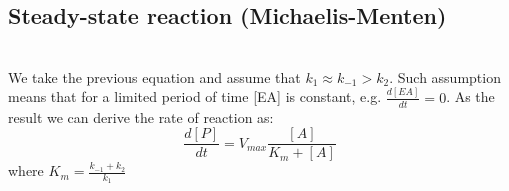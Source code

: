 \documentclass[twoside,twocolumn]{article}
\begin{document}
\subsection{Steady-state reaction (Michaelis-Menten)}
\label{subsec:enzyme_michaelis}
\\We take the previous equation and assume that $k_{1} \approx k_{-1} > k_{2}$. Such assumption means that for a limited period of time [EA] is constant, e.g. $\frac{d[EA]}{dt}=0$. As the result we can derive\cite[p.~55]{bisswanger_enzyme_2002} the rate of reaction as:
\[ \frac{d[P]}{dt} = V_{max}\frac{[A]}{K_{m} + [A]}\]
where $K_{m}=\frac{k_{-1} + k_{2}}{k_{1}}$
%
{}


\end{document}
